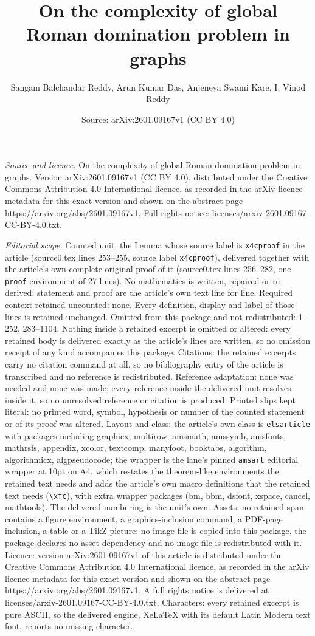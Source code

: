 \documentclass[10pt,a4paper]{amsart}
\title[On the complexity of global Roman domination problem in grap]{On the complexity of global Roman domination problem in graphs}
\author{Sangam Balchandar Reddy, Arun Kumar Das, Anjeneya Swami Kare, I. Vinod Reddy}
\date{Source: arXiv:2601.09167v1 (CC BY 4.0)}
\begin{document}
\maketitle

\noindent\emph{Source and licence.} On the complexity of global Roman domination problem in graphs. Version arXiv:2601.09167v1 (CC BY 4.0), distributed under the Creative Commons Attribution 4.0 International licence, as recorded in the arXiv licence metadata for this exact version and shown on the abstract page https://arxiv.org/abs/2601.09167v1. Full rights notice: licenses/arxiv-2601.09167-CC-BY-4.0.txt.\par\smallskip

\noindent\textit{Editorial scope.} Counted unit: the Lemma whose source label is \texttt{x4cproof} in the article (source0.tex lines 253--255, source label \texttt{x4cproof}), delivered together with the article's own complete original proof of it (source0.tex lines 256--282, one \texttt{proof} environment of 27 lines). No mathematics is written, repaired or re-derived: statement and proof are the article's own text line for line. Required context retained uncounted: none. Every definition, display and label of those lines is retained unchanged. Omitted from this package and not redistributed: 1--252, 283--1104. Nothing inside a retained excerpt is omitted or altered: every retained body is delivered exactly as the article's lines are written, so no omission receipt of any kind accompanies this package. Citations: the retained excerpts carry no citation command at all, so no bibliography entry of the article is transcribed and no reference is redistributed. Reference adaptation: none was needed and none was made; every reference inside the delivered unit resolves inside it, so no unresolved reference or citation is produced. Printed slips kept literal: no printed word, symbol, hypothesis or number of the counted statement or of its proof was altered. Layout and class: the article's own class is \texttt{elsarticle} with packages including graphicx, multirow, amsmath, amssymb, amsfonts, mathrsfs, appendix, xcolor, textcomp, manyfoot, booktabs, algorithm, algorithmicx, algpseudocode; the wrapper is the lane's pinned \texttt{amsart} editorial wrapper at 10pt on A4, which restates the theorem-like environments the retained text needs and adds the article's own macro definitions that the retained text needs (\texttt{\textbackslash xfc}), with extra wrapper packages (bm, bbm, dsfont, xspace, cancel, mathtools). The delivered numbering is the unit's own. Assets: no retained span contains a figure environment, a graphics-inclusion command, a PDF-page inclusion, a table or a TikZ picture; no image file is copied into this package, the package declares no asset dependency and no image file is redistributed with it. Licence: version arXiv:2601.09167v1 of this article is distributed under the Creative Commons Attribution 4.0 International licence, as recorded in the arXiv licence metadata for this exact version and shown on the abstract page https://arxiv.org/abs/2601.09167v1. A full rights notice is delivered at licenses/arxiv-2601.09167-CC-BY-4.0.txt. Characters: every retained excerpt is pure ASCII, so the delivered engine, XeLaTeX with its default Latin Modern text font, reports no missing character.
\end{document}

